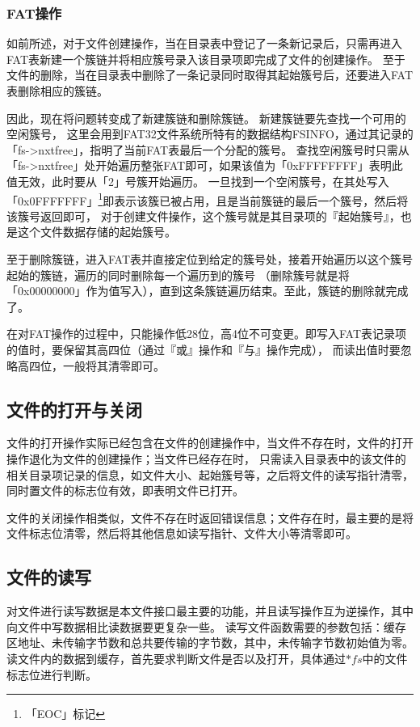 \subsubsection{FAT操作}
\label{sec:fat}
如前所述，对于文件创建操作，当在目录表中登记了一条新记录后，只需再进入FAT表新建一个簇链并将相应簇号录入该目录项即完成了文件的创建操作。
至于文件的删除，当在目录表中删除了一条记录同时取得其起始簇号后，还要进入FAT表删除相应的簇链。

因此，现在将问题转变成了新建簇链和删除簇链。
新建簇链要先查找一个可用的空闲簇号，
这里会用到FAT32文件系统所特有的数据结构FSINFO，通过其记录的「fs->nxtfree」，指明了当前FAT表最后一个分配的簇号。
查找空闲簇号时只需从「fs->nxtfree」处开始遍历整张FAT即可，如果该值为「0xFFFFFFFF」表明此值无效，此时要从「2」号簇开始遍历。
一旦找到一个空闲簇号，在其处写入「0x0FFFFFFF」\footnote{「EOC」标记}即表示该簇已被占用，且是当前簇链的最后一个簇号，然后将该簇号返回即可，
对于创建文件操作，这个簇号就是其目录项的『起始簇号』，也是这个文件数据存储的起始簇号。

至于删除簇链，进入FAT表并直接定位到给定的簇号处，接着开始遍历以这个簇号起始的簇链，遍历的同时删除每一个遍历到的簇号
（删除簇号就是将「0x00000000」作为值写入），直到这条簇链遍历结束。至此，簇链的删除就完成了。

在对FAT操作的过程中，只能操作低28位，高4位不可变更。即写入FAT表记录项的值时，要保留其高四位（通过『或』操作和『与』操作完成），
而读出值时要忽略高四位，一般将其清零即可。

\subsection{文件的打开与关闭}
\label{sec:Open}
文件的打开操作实际已经包含在文件的创建操作中，当文件不存在时，文件的打开操作退化为文件的创建操作；当文件已经存在时，
只需读入目录表中的该文件的相关目录项记录的信息，如文件大小、起始簇号等，之后将文件的读写指针清零，同时置文件的标志位有效，即表明文件已打开。

文件的关闭操作相类似，文件不存在时返回错误信息；文件存在时，最主要的是将文件标志位清零，然后将其他信息如读写指针、文件大小等清零即可。

\subsection{文件的读写}
\label{sec:Read}
对文件进行读写数据是本文件接口最主要的功能，并且读写操作互为逆操作，其中向文件中写数据相比读数据要更复杂一些。
读写文件函数需要的参数包括：缓存区地址、未传输字节数和总共要传输的字节数，其中，未传输字节数初始值为零。
读文件内的数据到缓存，首先要求判断文件是否以及打开，具体通过$*fs$中的文件标志位进行判断。


